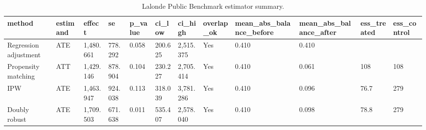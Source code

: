 \begin{table}
\caption{Lalonde Public Benchmark estimator summary.}
\label{tab:lalonde_public_benchmark-estimators}
\begin{tabular}{llllllllllll}
\toprule
method & estimand & effect & se & p_value & ci_low & ci_high & overlap_ok & mean_abs_balance_before & mean_abs_balance_after & ess_treated & ess_control \\
\midrule
Regression adjustment & ATE & 1,480.661 & 778.292 & 0.058 & 200.625 & 2,515.375 & Yes & 0.410 & 0.410 &  &  \\
Propensity matching & ATT & 1,429.146 & 878.904 & 0.104 & 230.227 & 2,705.414 & Yes & 0.410 & 0.061 & 108 & 108 \\
IPW & ATE & 1,463.947 & 924.038 & 0.113 & 318.039 & 3,781.286 & Yes & 0.410 & 0.096 & 76.7 & 279 \\
Doubly robust & ATE & 1,709.503 & 671.638 & 0.011 & 535.407 & 2,578.040 & Yes & 0.410 & 0.098 & 78.8 & 279 \\
\bottomrule
\end{tabular}
\end{table}
